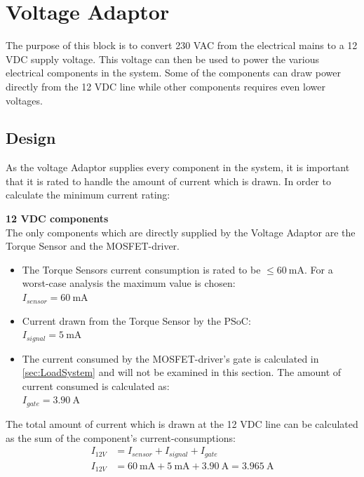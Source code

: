 \section{Voltage Adaptor}
The purpose of this block is to convert 230 VAC from the electrical mains to a 12 VDC supply voltage. This voltage can then be used to power the various electrical components in the system. Some of the components can draw power directly from the 12 VDC line while other components requires even lower voltages.

\subsection{Design}
As the voltage Adaptor supplies every component in the system, it is important that it is rated to handle the amount of current which is drawn.
In order to calculate the minimum current rating:

\textbf{12 VDC components}\\
The only components which are directly supplied by the Voltage Adaptor are the Torque Sensor and the MOSFET-driver.

\begin{itemize}
	\item The Torque Sensors current consumption is rated to be $\leq  \SI{60}{\milli \ampere}$. For a worst-case analysis the maximum value is chosen:\\
	$I_{sensor} = \SI{60}{\milli \ampere}$
	\item Current drawn from the Torque Sensor by the PSoC:\\
	$I_{signal} = \SI{5}{\milli \ampere}$
	\item The current consumed by the MOSFET-driver's gate is calculated in \ref{sec:LoadSystem} and will not be examined in this section. The amount of current consumed is calculated as:\\
	$I_{gate} = \SI{3.90}{\ampere}$
\end{itemize}

The total amount of current which is drawn at the 12 VDC line can be calculated as the sum of the component's current-consumptions:
\begin{equation}
	\begin{split}
		I_{12V} &= I_{sensor} + I_{signal} + I_{gate}\\
		I_{12V} &= \SI{60}{\milli \ampere} + \SI{5}{\milli \ampere} + \SI{3.90}{\ampere} = \SI{3.965}{\ampere}
	\end{split}
\end{equation}


